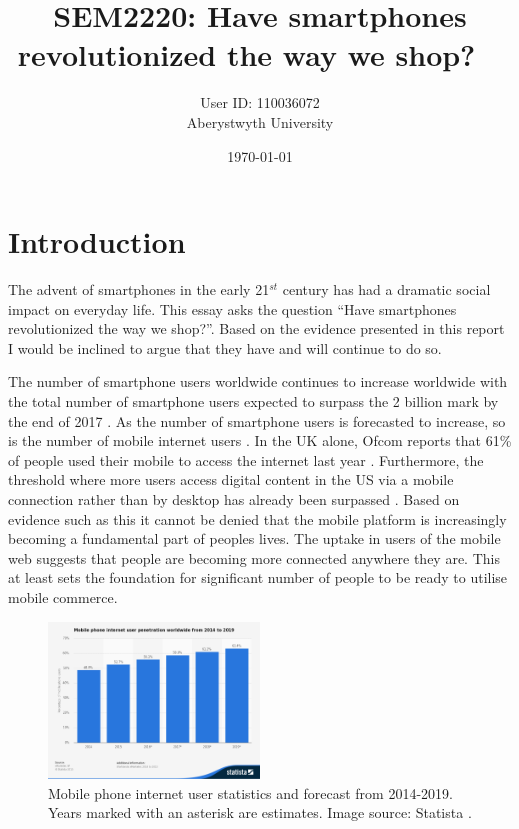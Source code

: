 \documentclass[paper=a4, fontsize=12pt]{scrartcl}	%
\title{
	\vspace{-0.5in} 	\usefont{OT1}{bch}{b}{n}
        SEM2220: Have smartphones revolutionized the way we shop? \
}
\author{
	\usefont{OT1}{bch}{m}{n} User ID: 110036072
	\\ \usefont{OT1}{bch}{m}{n} Aberystwyth University 
}
\date{\today}
\numberwithin{equation}{section}															%
\numberwithin{figure}{section}																%
\numberwithin{table}{section}
\begin{document}
\maketitle

\section{Introduction}
The advent of smartphones in the early 21$^{st}$ century has had a dramatic social impact on everyday life. This essay asks the question ``Have smartphones revolutionized the way we shop?''. Based on the evidence presented in this report I would be inclined to argue that they have and will continue to do so.

The number of smartphone users worldwide continues to increase worldwide with the total number of smartphone users expected to surpass the 2 billion mark by the end of 2017 \cite{emarketer2016smartphone}. As the number of smartphone users is forecasted to increase, so is the number of mobile internet users \cite{statista2016mobile}. In the UK alone, Ofcom reports that 61\% of people used their mobile to access the internet last year \cite{ofcom2016facts}. Furthermore, the threshold where more users access digital content in the US via a mobile connection rather than by desktop has already been surpassed \cite{comscore2014us}. Based on evidence such as this it cannot be denied that the mobile platform is increasingly becoming a fundamental part of peoples lives. The uptake in users of the mobile web suggests that people are becoming more connected anywhere they are. This at least sets the foundation for significant number of people to be ready to utilise mobile commerce.

\begin{figure}[H]
\centering
\includegraphics[width=0.5\textwidth]{img/statistic-mobile-phone-internet-user-penetration-worldwide-2014-2019.png}
\caption{Mobile phone internet user statistics and forecast from 2014-2019. Years marked with an asterisk are estimates. Image source: Statista \cite{statista2016mobile}.}
\label{fig:}
\end{figure}
\end{document}
